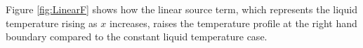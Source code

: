 \documentclass[11pt]{article}
\begin{document}
Figure \ref{fig:LinearF} shows how the linear source term, which represents the liquid temperature rising as $x$ increases, raises the temperature profile at the right hand boundary compared to the constant liquid temperature case.

%



\pagebreak
\end{document}
